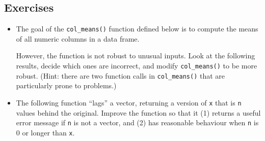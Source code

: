 \subsection{Exercises}

\begin{itemize}
\item
  The goal of the \texttt{col\_means()} function defined below is to
  compute the means of all numeric columns in a data frame.

\begin{Shaded}
\begin{Highlighting}[]
\StringTok{ }
  \StringTok{ }
  \StringTok{ }

  \NormalTok{(}
\NormalTok{\}}
\end{Highlighting}
\end{Shaded}

  However, the function is not robust to unusual inputs. Look at the
  following results, decide which ones are incorrect, and modify
  \texttt{col\_means()} to be more robust. (Hint: there are two function
  calls in \texttt{col\_means()} that are particularly prone to
  problems.)

\begin{Shaded}
\begin{Highlighting}[]
\NormalTok{(mtcars[, }\NormalTok{])}
\NormalTok{(mtcars[}\NormalTok{, ])}
\NormalTok{(mtcars[, }\NormalTok{, } \NormalTok{F])}
\NormalTok{(}\NormalTok{:}\NormalTok{)}
\NormalTok{(}
\NormalTok{(}

\StringTok{ }
\NormalTok{mtcars2[-}\NormalTok{] <-}\StringTok{ }\NormalTok{(mtcars2[-}\NormalTok{], as.character)}
\end{Highlighting}
\end{Shaded}
\item
  The following function ``lags'' a vector, returning a version of
  \texttt{x} that is \texttt{n} values behind the original. Improve the
  function so that it (1) returns a useful error message if \texttt{n}
  is not a vector, and (2) has reasonable behaviour when \texttt{n} is 0
  or longer than \texttt{x}.


\end{itemize}
